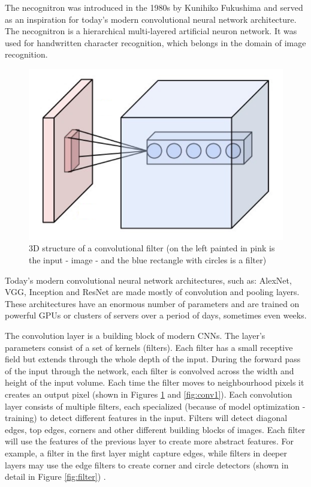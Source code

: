 \documentclass[times, utf8, diplomski]{fer}
\begin{document}
The necognitron was introduced in the 1980s by Kunihiko Fukushima \citep{fukushima_neocognitron:_1982, eckmiller_hierarchical_1989} and served as an inspiration for today's modern convolutional neural network architecture. The necognitron is a hierarchical multi-layered artificial neuron network. It was used for handwritten character recognition, which belongs in the domain of image recognition.

\begin{figure}
  \includegraphics[scale=0.5]{figures/conv.png}
  \centering
  \caption{3D structure of a convolutional filter (on the left painted in pink is the input - image - and the blue rectangle with circles is a filter)}
  \label{fig:conv}
\end{figure}

Today's modern convolutional neural network architectures, such as: AlexNet, VGG, Inception and ResNet \citep{krizhevsky_imagenet_2012, simonyan_very_2014, szegedy_going_2015, he_deep_2016} are made mostly of convolution and pooling layers. These architectures have an enormous number of parameters and are trained on powerful GPUs or clusters of servers over a period of days, sometimes even weeks.

The convolution layer is a building block of modern CNNs. The layer's parameters consist of a set of kernels (filters). Each filter has a small receptive field but extends through the whole depth of the input. During the forward pass of the input through the network, each filter is convolved across the width and height of the input volume. Each time the filter moves to neighbourhood pixels it creates an output pixel (shown in Figures \ref{fig:conv} and \ref{fig:conv1}). Each convolution layer consists of multiple filters, each specialized (because of model optimization - training) to detect different features in the input. Filters will detect diagonal edges, top edges, corners and other different building blocks of images. Each filter will use the features of the previous layer to create more abstract features. For example, a filter in the first layer might capture edges, while filters in deeper layers may use the edge filters to create corner and circle detectors (shown in detail in Figure \ref{fig:filter}) \citep{simonyan_very_2014}.
\end{document}
